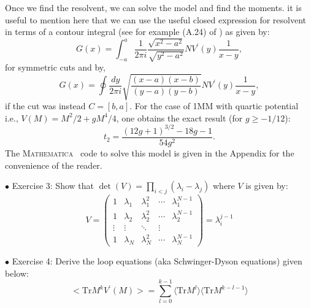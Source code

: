 \documentclass[11pt]{article}
\newcommand{\MA}{\textsc{Mathematica}}
\begin{document}
Once we find the resolvent, we can solve the model and find the moments. it is useful to mention here that we can use the useful closed expression for resolvent in terms of a contour integral (see for example (A.24) of \cite{Migdal:1983qrz})
as given by:
\begin{equation}
	G(x) = \int_{-a}^{a} \frac{1}{2\pi i} \frac{\sqrt{x^2-a^2}}{\sqrt{y^2-a^2}} N V^{\prime}(y) \frac{1}{x-y}, 
\end{equation}
for symmetric cuts and by,
\begin{equation}
	G(x) = \oint \frac{dy}{2\pi i} \sqrt{\frac{(x-a) (x-b)}{(y-a)(y-b)}}  N V^{\prime}(y) \frac{1}{x-y}, 
\end{equation}
if the cut was instead $ C= [b,a]$. For the case of 1MM with quartic potential i.e., $V(M) = M^2/2 + gM^4/4$, one obtains the exact result (for $g \ge -1/12$):
\begin{equation}
\label{eq:exact1MM} 
t_{2} = \frac{(12 g+1)^{3/2}-18 g-1}{54 g^2}. 
\end{equation}
The \MA~  code to solve this model is given in the Appendix for the convenience of the reader. 


\begin{mdframed}[backgroundcolor=blue!3] 
	\textsc{} 
	$\bullet$ Exercise 3: Show that $\det(V) = \prod_{i<j} (\lambda_i - \lambda_j)$ where $V$ is given by: 
	\begin{equation*}
		V = 
		\begin{pmatrix}
			1 & \lambda_1 & \lambda_{1}^{2} & \cdots & \lambda_{1}^{N-1} \\
			1 & \lambda_2 & \lambda_{2}^{2} & \cdots & \lambda_{2}^{N-1} \\ 
			\vdots  & \vdots  & \ddots & \vdots  \\
			1 & \lambda_N & \lambda_{N}^{2} & \cdots & \lambda_{N}^{N-1} 
		\end{pmatrix} = \lambda_{i}^{j-1} 
	\end{equation*}
	
\end{mdframed} 

\begin{mdframed}[backgroundcolor=blue!3] 
	\textsc{} 
	$\bullet$ Exercise 4: Derive the loop equations (aka Schwinger-Dyson equations) given below: \\ 
	\begin{equation}
		\label{eq:LE1} 
		\Big< \mbox{Tr} M^{k} V^{\prime}(M) \Big> = \sum_{l=0}^{k-1} \langle \mbox{Tr} M^{l} \rangle  \langle \mbox{Tr} M^{k-l-1} \rangle
	\end{equation} 
\end{mdframed} 
\end{document}
